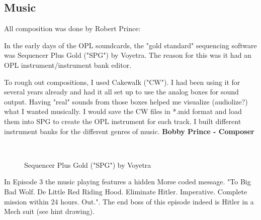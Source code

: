 \documentclass[book.tex]{subfiles}
\begin{document}
\par
{}


\subsection{Music}
All composition was done by Robert Prince:\\
\par
 \begin{fancyquotes}
In the early days of the OPL soundcards, the "gold standard" sequencing software was Sequencer Plus Gold ("SPG") by Voyetra. The reason for this was it had an OPL instrument/instrument bank editor.\\
\par
To rough out compositions, I used Cakewalk ("CW"). I had been using it for several years already and had it all set up to use the analog boxes for sound output. Having "real" sounds from those boxes helped me visualize (audiolize?) what I wanted musically. I would save the CW files in *.mid format and load them into SPG to create the OPL instrument for each track. I built different instrument banks for the different genres of music.
\bigskip
\textbf{Bobby Prince - Composer}
 \end{fancyquotes}\\

\begin{figure}[H]
\centering
\caption{Sequencer Plus Gold ("SPG") by Voyetra}
\end{figure}



 In Episode 3 the music playing features a hidden Morse coded message. "To Big Bad Wolf. De Little Red Riding Hood. Eliminate Hitler. Imperative. Complete mission within 24 hours. Out.". The end boss of this episode indeed is Hitler in a Mech suit (see hint drawing).
\end{document}
